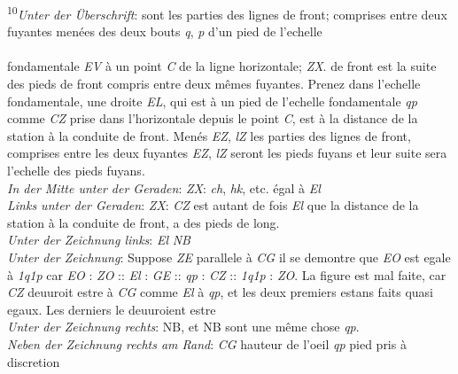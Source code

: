 \footnoterule
\pstart\noindent\textsuperscript{10}\textit{Unter der \"{U}berschrift}:  sont les parties des lignes de front; comprises entre deux fuyantes\protect{} men\'{e}es des deux bouts \textit{q}, \textit{p} d'un pied de l'echelle\protect{}
\\
\footnoterule\\
fondamentale \textit{EV} \`{a} un point \textit{C} de la ligne horizontale; \textit{ZX}.\protect{} de front est la suite des pieds de front compris entre deux m\^{e}mes fuyantes. Prenez dans l'echelle\protect{} fondamentale, une droite \textit{EL}, qui est \`{a} un pied de l'echelle\protect{} fondamentale \textit{qp} comme \textit{CZ} prise dans l'horizontale depuis le point \textit{C}, est \`{a} la distance de la station \`{a} la conduite de front. Men\'{e}s \textit{EZ}, \textit{lZ } les parties des lignes de front, comprises entre les deux fuyantes \textit{EZ}, \textit{lZ} seront les pieds fuyans et leur suite sera l'echelle\protect{} des pieds fuyans.\\ \textit{In der Mitte unter der Geraden}: \textit{ZX}: \textit{ch}, \textit{hk}, etc. \'{e}gal \`{a} \textit{El}\\ \textit{Links unter der Geraden}: \textit{ZX}: \textit{CZ} est autant de fois \textit{El} que la distance de la station \`{a} la conduite de front, a des pieds de long.\\ \textit{Unter der Zeichnung links}: \textit{El} \textit{NB}\\ \textit{Unter der Zeichnung}: Suppose \textit{ZE} parallele \`{a} \textit{CG} il se demontre que \textit{EO} est egale \`{a} \textit{1q1p} car \textit{EO} : \textit{ZO} :: \textit{El} : \textit{GE} :: \textit{qp} : \textit{CZ} :: \textit{1q1p} : \textit{ZO}. La figure est mal faite, car \textit{CZ} deuuroit estre \`{a} \textit{CG} comme \textit{El} \`{a} \textit{qp}, et les deux premiers estans faits quasi egaux. Les derniers le deuuroient estre \\ \textit{Unter der Zeichnung rechts}:  NB, et  NB sont une m\^{e}me chose \textit{qp}.\\ \textit{Neben der Zeichnung rechts am Rand}: \textit{CG} hauteur de l'oeil \textit{qp} pied  pris \`{a} discretion\\

